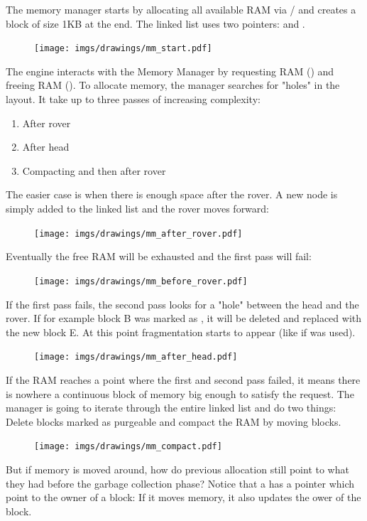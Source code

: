 \documentclass[book.tex]{subfiles}
\begin{document}
The memory manager starts by allocating all available RAM via / and creates a  block of size 1KB at the end. The linked list uses two pointers:  and .
 \par
\begin{figure}[H]
\centering
 \texttt{[image: imgs/drawings/mm\_start.pdf]}
 \end{figure}
 \par
 The engine interacts with the Memory Manager by requesting RAM () and freeing RAM (). To allocate memory, the manager searches for "holes" in the layout. It take up to three passes of increasing complexity:
\begin{enumerate}
\item After rover
\item After head
\item Compacting and then after rover
\end{enumerate}
\par
  The easier case is when there is enough space after the rover. A new node is simply added to the linked list and the rover moves forward:\\
  \par
\begin{figure}[H]
\centering
 \texttt{[image: imgs/drawings/mm\_after\_rover.pdf]}
 \end{figure}
 \par
Eventually the free RAM will be exhausted and the first pass will fail:
  \par
\begin{figure}[H]
\centering
 \texttt{[image: imgs/drawings/mm\_before\_rover.pdf]}
 \end{figure}
 \par
 If the first pass fails, the second pass looks for a "hole" between the head and the rover. If for example block B was marked as , it will be deleted and replaced with the new block E. At this point fragmentation starts to appear (like if  was used).\\
 \begin{figure}[H]
\centering
 \texttt{[image: imgs/drawings/mm\_after\_head.pdf]}
 \end{figure}
 \par
 If the RAM reaches a point where the first and second pass failed, it means there is nowhere a continuous block of memory big enough to satisfy the request. The manager is going to iterate through the entire linked list and do two things: Delete blocks marked as purgeable and compact the RAM by moving blocks.
  \par
\begin{figure}[H]
\centering
 \texttt{[image: imgs/drawings/mm\_compact.pdf]}
 \end{figure}
 \par
But if memory is moved around, how do previous allocation still point to what they had before the garbage collection phase? Notice that a  has a  pointer which point to the owner of a block: If it moves memory, it also updates the ower of the block.
\end{document}
